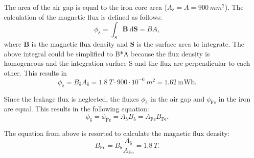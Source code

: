 \begin{solutionblock}
    The area of the air gap is equal to the iron core area ($A_{\mathrm{\updelta}} = A = 900 \ \si{mm^2}$).
    The calculation of the magnetic flux is defined as follows:
    \begin{equation}
        \phi_{\updelta} = \int_{S}^{} \boldsymbol{B} \ \mathrm{d} \boldsymbol{S}
        = B A,
    \end{equation}
    where $\boldsymbol{B}$ is the magnetic flux density and $\boldsymbol{S}$ is the surface area to integrate. The above integral could be simplified to B*A because the flux density is homogeneous and the integration surface S  and the flux are perpendicular to each other. 
    This results in
    \begin{equation}
        \phi_{\updelta}  = B_{\updelta} A_{\updelta}
        = 1.8 \ \si{T} \cdot 900 \cdot 10^{-6} \ \si{m^2}
        = 1.62 \ \mathrm{mWb}.
    \end{equation}

\end{solutionblock}




\begin{solutionblock}
    Since the leakage flux is neglected, the fluxes $\phi_{\mathrm{\updelta}}$ in the air gap and $\phi_{\mathrm{Fe}}$ in the iron are equal. This results in the following equation:
    \begin{equation}
        \phi_{\mathrm{\updelta}} = \phi_{\mathrm{Fe}}
        = A_{\mathrm{\updelta}} B_{\mathrm{\updelta}}
        = A_{\mathrm{Fe}} B_{\mathrm{Fe}}.
    \end{equation}

    The equation from above is resorted to calculate the magnetic flux density:
    \begin{equation}
        B_{\mathrm{Fe}} = B_{\mathrm{\updelta}} \frac{A_{\mathrm{\updelta}}}{A_{\mathrm{Fe}}} = 1.8 \ \si{T}.
    \end{equation}

\end{solutionblock}



